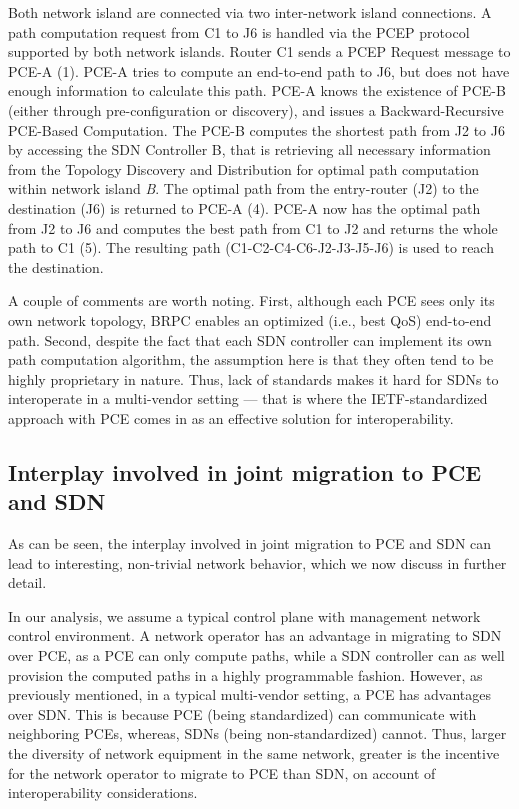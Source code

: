 \documentclass[smallextended]{svjour3}
\begin{document}
\par Both network island are connected via two inter-network island connections.
A path computation request from C1 to J6 is handled via the PCEP protocol
supported by both network islands. Router C1 sends a PCEP Request message to
PCE-A (1). PCE-A tries to compute an end-to-end path to J6, but does not have
enough information to calculate this path. PCE-A knows the existence of PCE-B
(either through pre-configuration or discovery), and issues a Backward-Recursive
PCE-Based Computation. The PCE-B computes the shortest path from J2 to J6 by
accessing the SDN Controller B, that is retrieving all necessary information
from the Topology Discovery and Distribution for optimal path computation within
network island \emph{B}. The optimal path from the entry-router (J2) to the destination
(J6) is returned to PCE-A (4). PCE-A now has the optimal path from J2 to J6 and
computes the best path from C1 to J2 and returns the whole path to C1 (5). The
resulting path (C1-C2-C4-C6-J2-J3-J5-J6) is used to reach the
destination.

\par A couple of comments are worth noting.
First, although each PCE sees only its own network topology, BRPC enables an
optimized (i.e., best QoS) end-to-end path. Second, despite the fact that each
SDN controller can implement its own path computation algorithm, the assumption
here is that they often tend to be highly proprietary in nature. Thus, lack of
standards makes it hard for SDNs to interoperate in a multi-vendor setting ---
that is where the IETF-standardized approach with PCE comes in as an effective
solution for interoperability.

\subsection{Interplay involved in joint migration to PCE and SDN} As can be
seen, the interplay involved in joint migration to PCE and SDN can lead to
interesting, non-trivial network behavior, which we now discuss in further
detail.

\par In our analysis, we assume a typical control plane with management network
control environment. A network operator has an advantage in migrating to SDN
over PCE, as a PCE can only compute paths, while a SDN controller can as well
provision the computed paths in a highly programmable fashion. However, as
previously mentioned, in a typical multi-vendor setting, a PCE has advantages
over SDN. This is because PCE (being standardized) can communicate with
neighboring PCEs, whereas, SDNs (being non-standardized) cannot. Thus, larger
the diversity of network equipment in the same network, greater is the incentive
for the network operator to migrate to PCE than SDN, on account of
interoperability considerations.
\end{document}
